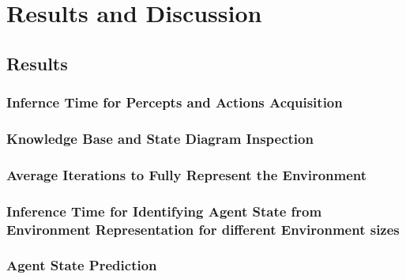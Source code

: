 





\chapter{Results and Discussion} 
\label{chapter:Results_and_Discussion}

\section{Results}


\subsection{Infernce Time for Percepts and Actions Acquisition}




\subsection{Knowledge Base and State Diagram Inspection}




\subsection{Average Iterations to Fully Represent the Environment}


\subsection{Inference Time for Identifying Agent State from Environment Representation for different Environment sizes} 



\subsection{Agent State Prediction}



